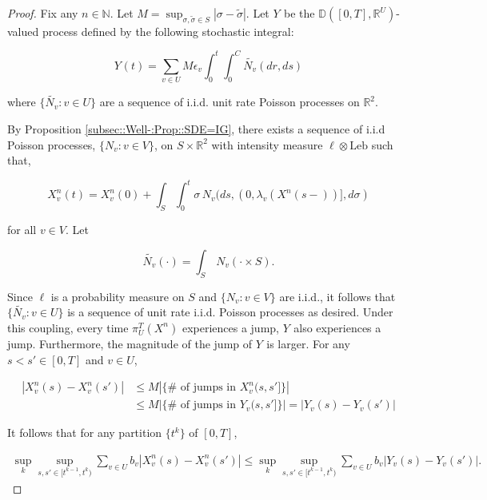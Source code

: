 \documentclass[12pt]{article}
\newcommand{\mb}{\mathbb}
\newcommand{\te}{\text}
\newcommand{\ep}{\epsilon}
\newcommand{\ind}{\hspace{24pt}}
\newcommand{\cad}{\mb{D}}							%
\renewcommand{\v}{v}							%
\renewcommand{\U}{U}							%
\renewcommand{\S}{S}							%
\newcommand{\s}{\sigma}							%
\renewcommand{\b}[1]{b_{#1}}					%
\newcommand{\ev}[1]{\ep_{#1}}					%
\newcommand{\T}{T}								%
\renewcommand{\t}{t}							%
\newcommand{\poiss}[1]{N_{#1}}						%
\newcommand{\leb}{\te{Leb}}							%
\newcommand{\pup}[1]{^{#1}}							%
\renewcommand{\ss}{\tilde{\s}}					%
\newcommand{\V}{V}									%
\renewcommand{\tt}{s}								%
\newcommand{\ttt}{s'}								%
\renewcommand{\r}{r}								%
\renewcommand{\it}{k}								%
\newcommand{\numb}{n}								%
\newcommand{\piV}[2]{\pi_{#1}^{#2}}					%
\newcommand{\rxvtn}[3]{X_{#1}^{#3}(#2)}				%
\newcommand{\rxvtt}[2]{Y_{#1}{(#2)}}				%
\newcommand{\rxvtsn}[3]{X_{#1}^{#3}{#2}}			%
\newcommand{\rxvtts}[2]{Y_{#1}{#2}}					%
\newcommand{\rate}[1]{\lambda_{#1}}					%
\newcommand{\const}[1]{C_{#1}}						%
\newcommand{\Sm}{\ell}								%
\newcommand{\alt}{\widetilde}						%
\begin{document}
\begin{proof}
Fix any \(\numb \in \mb{N}\). Let \(M = \sup_{\s,\ss \in \S} |\s - \ss|\). Let \(\rxvtts{}{}\) be the \(\cad([0,\T],\mb{R}^\U)\)-valued process defined by the following stochastic integral:

\[\rxvtt{}{\t} = \sum_{\v \in \U}M\ev{\v}\int_0^\t\int_0^{\const{}}\alt{\poiss{\v}}(d\r, d\tt)\]

where \(\{\alt{\poiss{\v}}:\v \in \U\}\) are a sequence of i.i.d. unit rate Poisson processes on \(\mb{R}^2\). 

\ind By Proposition \ref{subsec::Well-:Prop::SDE=IG}, there exists a sequence of i.i.d Poisson processes, \(\{\poiss{\v}:\v\in \V\}\), on \(\S\times\mb{R}^2\) with intensity measure \(\Sm\otimes \leb\) such that,

\[\rxvtn{\v}{\t}{\numb} = \rxvtn{\v}{0}{\numb} + \int_\S\int_0^\t \s\,\poiss{\v}(d\tt,(0,\rate{\v}(\rxvtn{}{\tt-}{\numb})],d\s)\]

for all \(\v\in \V\). Let

\[\alt{\poiss{\v}}(\cdot) = \int_\S\,\poiss{\v}(\cdot\times \S).\]

Since \(\Sm\) is a probability measure on \(\S\) and \(\{\poiss{\v}:\v\in \V\}\) are i.i.d., it follows that \(\{\alt{\poiss{\v}}:\v\in \U\}\) is a sequence of unit rate i.i.d. Poisson processes as desired. Under this coupling, every time \(\piV{\U}{\T}(\rxvtsn{}{}{\numb})\) experiences a jump, \(\rxvtts{}{}\) also experiences a jump. Furthermore, the magnitude of the jump of \(\rxvtts{}{}\) is larger. For any \(\tt<\ttt\in [0,\T]\) and \(\v\in \U\),

\begin{align*}
|\rxvtn{\v}{\tt}{\numb} - \rxvtn{\v}{\ttt}{\numb}|&\leq M\left|\{\#\te{ of jumps in }\rxvtsn{\v}{(\tt,\ttt]}{\numb}\}\right| \\
&\leq M\left|\{\#\te{ of jumps in }\rxvtts{\v}{(\tt,\ttt]}\}\right| = \left|\rxvtt{\v}{\tt} - \rxvtt{\v}{\ttt}\right|
\end{align*}

It follows that for any partition \(\{\t\pup{\it}\}\) of \([0,\T]\),

\begin{align*}
\sup_\it\sup_{\tt,\ttt \in [\t\pup{\it-1},\t\pup{\it})} \sum_{\v\in \U} \b{\v}|\rxvtn{\v}{\tt}{\numb} - \rxvtn{\v}{\ttt}{\numb}|\leq \sup_\it\sup_{\tt,\ttt \in [\t\pup{\it-1},\t\pup{\it})} \sum_{\v\in \U} \b{\v}|\rxvtt{\v}{\tt} - \rxvtt{\v}{\ttt}|.
\end{align*}


\end{proof}
\end{document}
